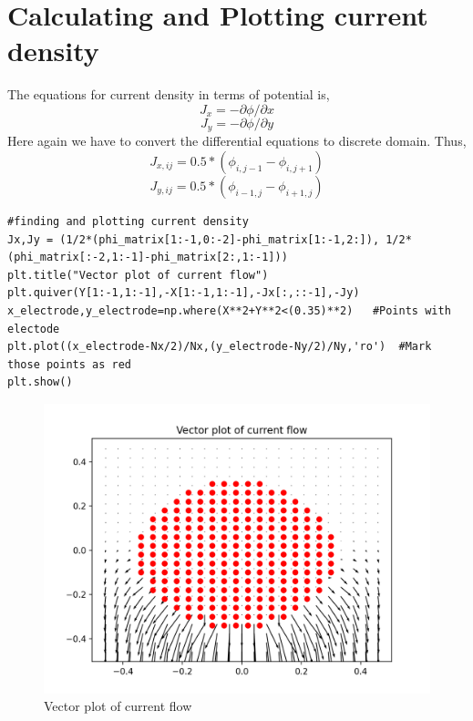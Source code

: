 \documentclass[11pt, a4paper]{article}
\begin{document}
\section{Calculating and Plotting current density}
The equations for current density in terms of potential is,
\begin{equation}
    J_x = -\partial\phi/\partial x
\end{equation}
\begin{equation}
    J_y = -\partial\phi/\partial y
\end{equation}
Here again we have to convert the differential equations to discrete domain. Thus,
\begin{equation}
    J_{x,ij} = 0.5*(\phi_{i,j-1} - \phi_{i,j+1})
\end{equation}
\begin{equation}
    J_{y,ij} = 0.5*(\phi_{i-1,j} - \phi_{i+1,j})
\end{equation}
\begin{lstlisting}
#finding and plotting current density
Jx,Jy = (1/2*(phi_matrix[1:-1,0:-2]-phi_matrix[1:-1,2:]), 1/2*(phi_matrix[:-2,1:-1]-phi_matrix[2:,1:-1]))
plt.title("Vector plot of current flow")
plt.quiver(Y[1:-1,1:-1],-X[1:-1,1:-1],-Jx[:,::-1],-Jy)
x_electrode,y_electrode=np.where(X**2+Y**2<(0.35)**2)   #Points with electode
plt.plot((x_electrode-Nx/2)/Nx,(y_electrode-Ny/2)/Ny,'ro')  #Mark those points as red
plt.show()
\end{lstlisting}
\begin{figure}[h!]
\centering
\includegraphics[scale=0.6]{Fig-7.png}
\caption{Vector plot of current flow}
\label{Vector plot of current flow}
\end{figure}
\end{document}
